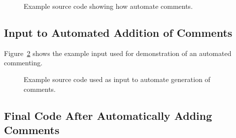 \begin{figure}[!h]
{\indent
{\mySmallFontSize

\begin{latexonly}
   
\end{latexonly}

\begin{htmlonly}
   
\end{htmlonly}

}
}
\caption{Example source code showing how automate comments. }
\label{Tutorial:example_addComments}
\end{figure}



\subsection{Input to Automated Addition of Comments}

   Figure~\ref{Tutorial:exampleInputCode_addComments}
shows the example input used for demonstration of an automated commenting.

\begin{figure}[!h]
{\indent
{\mySmallFontSize

\begin{latexonly}
   
\end{latexonly}

\begin{htmlonly}
   
\end{htmlonly}

}
}
\caption{Example source code used as input to automate generation of comments.}
\label{Tutorial:exampleInputCode_addComments}
\end{figure}



\subsection{Final Code After Automatically Adding Comments}

